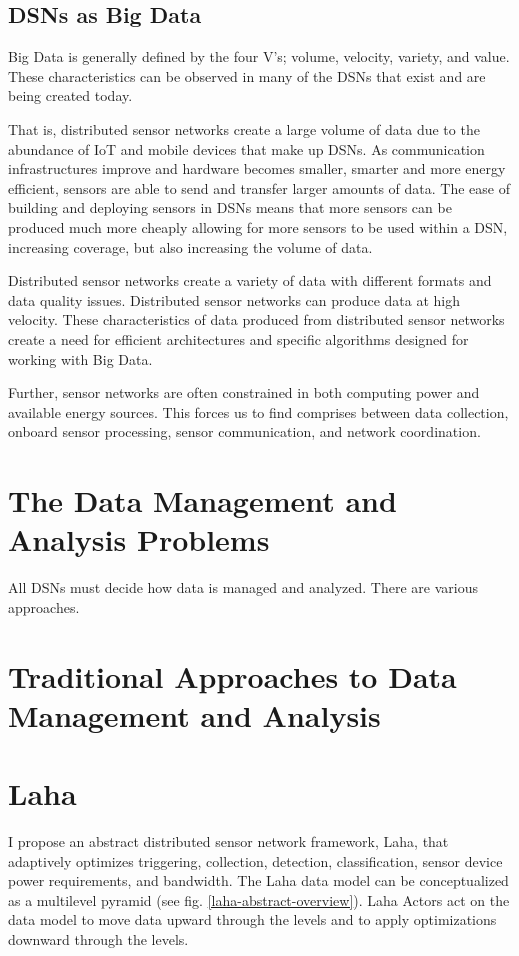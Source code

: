 \subsection{DSNs as Big Data}
Big Data is generally defined by the four V's; volume, velocity, variety, and value. These characteristics can be observed in many of the DSNs that exist and are being created today. %

That is, distributed sensor networks create a large volume of data due to the abundance of IoT and mobile devices that make up DSNs. As communication infrastructures improve and hardware becomes smaller, smarter and more energy efficient, sensors are able to send and transfer larger amounts of data. The ease of building and deploying sensors in DSNs means that more sensors can be produced much more cheaply allowing for more sensors to be used within a DSN, increasing coverage, but also increasing the volume of data.

Distributed sensor networks create a variety of data with different formats and data quality issues. Distributed sensor networks can produce data at high velocity. These characteristics of data produced from distributed sensor networks create a need for efficient architectures and specific algorithms designed for working with Big Data.

Further, sensor networks are often constrained in both computing power and available energy sources. This forces us to find comprises between data collection, onboard sensor processing, sensor communication, and network coordination.

\section{The Data Management and Analysis Problems}
All DSNs must decide how data is managed and analyzed. There are various approaches.

\section{Traditional Approaches to Data Management and Analysis}

\section{Laha}
I propose an abstract distributed sensor network framework, Laha, that adaptively optimizes triggering, collection, detection, classification, sensor device power requirements, and bandwidth. The Laha data model can be conceptualized as a multilevel pyramid (see fig. \ref{laha-abstract-overview}). Laha Actors act on the data model to move data upward through the levels and to apply optimizations downward through the levels.

